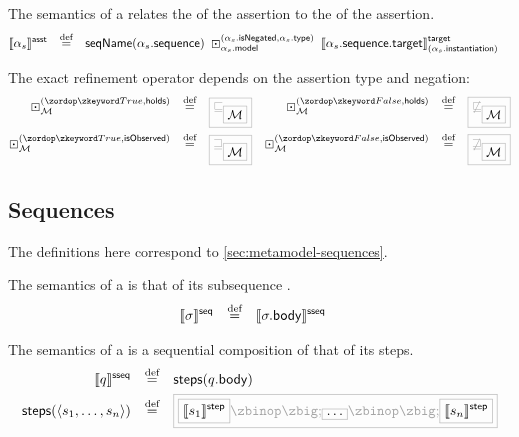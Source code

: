 \begin{definition}[\massertion]

\newcommand{\refop}[3]{\arefop_{#1}^{(#2, #3)}}

The semantics of a
\msequenceassertion{} relates the \msequence{} of the assertion to the
\mtarget{} of the assertion.
%
\begin{align*}
	\asstsema{\asasst}
\quad\defeq\quad&
	\seqnameOf{\field{\asasst}{sequence}}
	\;
	\refop{\field{\asasst}{model}}{\field{\asasst}{isNegated}}{\field{\asasst}{type}}
	\;
	\targetsema{\field{\field{\asasst}{sequence}}{target}}{\field{\asasst}{instantiation}}
\end{align*}

The exact refinement operator depends on the assertion type and negation:
%
\begin{align*}
	\refop{\amodel}{\true}{\mathsf{holds}}
\quad\defeq\quad&
	\tlang{\sqsubseteq_{\olang{\amodel}}}
&
	\refop{\amodel}{\false}{\mathsf{holds}}
\quad\defeq\quad&
	\tlang{\not\sqsubseteq_{\olang{\amodel}}}
\\
	\refop{\amodel}{\true}{\mathsf{isObserved}}
\quad\defeq\quad&
	\tlang{\sqsupseteq_{\olang{\amodel}}}
&
	\refop{\amodel}{\false}{\mathsf{isObserved}}
\quad\defeq\quad&
	\tlang{\not\sqsupseteq_{\olang{\amodel}}}
\\
\end{align*}
\end{definition}


\subsection{Sequences}\label{ssec:semantics-tockcsp-sequences}

The definitions here correspond to \cref{sec:metamodel-sequences}.

\begin{definition}[\msequence]

The semantics of a \msequence{} is that of its subsequence
.
%
\begin{align*}
	\llbracket \sigma \rrbracket^{\mathsf{seq}}
\quad\mathbin{\overset{\text{def}}=}\quad&	
	\llbracket \sigma.\mathsf{body} \rrbracket^{\mathsf{sseq}}
\end{align*}

\end{definition}

\begin{definition}[\msubsequence]

The semantics of a \msubsequence{} is a sequential composition of that of its steps.
%
\begin{align*}
	\sseqsema{\asseq}
	\quad\defeq\quad&	
	\funcname{steps}(\field{\asseq}{body})
\\
	\funcname{steps}(\langle \astep_1, \dotsc, \astep_n \rangle)
	\quad\defeq\quad&	
	\tlang{
	\olang{\stepsema{\astep_1}}
	\circseq
	\olang{\dotso}
	\circseq
	\olang{\stepsema{\astep_n}}
	}
\end{align*}

\end{definition}

